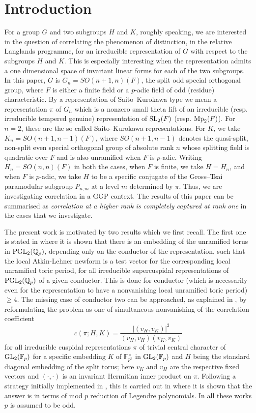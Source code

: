 \documentclass[12pt]{amsart}
\theoremstyle{definition}
\theoremstyle{remark}
\begin{document}
\section{Introduction}\label{intro}

For a group $G$ and two subgroups $H$ and $K$, roughly speaking, we are interested in the question of correlating the phenomenon of distinction, in the relative Langlands programme, for an irreducible representation of $G$ with respect to the subgroups $H$ and $K$. This is especially interesting when the representation admits a one dimensional space of invariant linear forms for each of the two subgroups. In this paper, $G$ is $G_n = SO(n+1,n)(F)$, the split odd special orthogonal group, where $F$ is either a finite field or a $p$-adic field of odd (residue) characteristic. By a representation of Saito–Kurokawa type we mean a representation $\pi$ of $G_n$ which is a nonzero small theta lift of an irreducible (resp. irreducible tempered genuine) representation of ${\rm SL}_2(F)$ (resp. ${\rm Mp}_2(F)$). For $n=2$, these are the so called Saito–Kurokawa representations. For $K$, we take $K_n=SO(n+1,n-1)(F)$, where $SO(n+1,n-1)$ denotes the quasi-split, non-split even special orthogonal group of absolute rank $n$ whose splitting field is quadratic over $F$ and is also unramified when $F$ is $p$-adic. Writing $H_n=SO(n,n)(F)$ in both the cases, when $F$ is finite, we take $H=H_n$, and when $F$ is $p$-adic, we take $H$ to be a specific conjugate of the Gross–Tsai paramodular subgroup $P_{n,m}$ at a level $m$ determined by $\pi$. Thus, we are investigating correlation in a GGP context. The results of this paper can be summarised as  
{\it correlation at a higher rank is completely captured at rank one}
in the cases that we investigate.

The present work is motivated by two results which we first recall. The first one is stated in \cite[\S 7.1]{bhko24} where it is shown that there is an embedding of the unramified torus in ${\rm PGL}_2(\mathbb Q_p)$, depending only on the conductor of the representation, such that the local Atkin-Lehner newform is a test vector for the corresponding local unramified toric period, for all irreducible supercuspidal representations of ${\rm PGL}_2(\mathbb Q_p)$ of a given conductor. This is done for conductor (which is necessarily even for the representation to have a nonvanishing local unramified toric period) $\geq 4$. The missing case of conductor two can be approached, as explained in \cite[pp. 85-86]{vat23}, by reformulating the problem as one of simultaneous nonvanishing of the correlation coefficient \cite[\S 8, \S9]{gro91}
\[c(\pi;H,K) = \frac{|(v_H,v_K)|^2}{(v_H,v_H)(v_K,v_K)}\]
for all irreducible cuspidal representations $\pi$ of trivial central character of ${\rm GL}_2(\mathbb F_p)$ for a specific embedding $K$ of $\mathbb F_{p^2}^\times$ in ${\rm GL}_2(\mathbb F_p)$ and $H$ being the standard diagonal embedding of the split torus; here $v_K$ and $v_H$ are the respective fixed vectors and $(\cdot,\cdot)$ is an invariant Hermitian inner product on $\pi$. Following a strategy initially implemented in \cite{aj22}, this is carried out in \cite{ana25} where it is shown that the answer is in terms of mod $p$ reduction of Legendre polynomials. In all these works $p$ is assumed to be odd.
\end{document}
